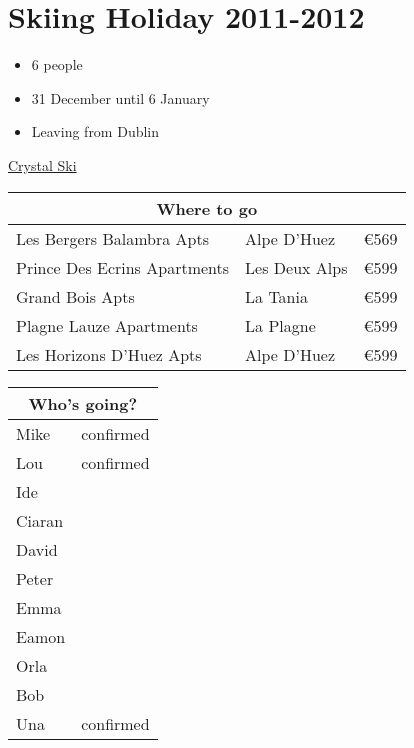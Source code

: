 \documentclass[a4paper]{article}
\begin{document}
\section*{Skiing Holiday 2011-2012}
\begin{itemize}
\item 6 people
\item 31 December until 6 January
\item Leaving from Dublin
\end{itemize}
\href{http://crystalski.ie}{Crystal Ski}

\begin{tabular}{|l|l|l|}
\hline
\multicolumn{3}{|c|}{Where to go} \\
\hline
Les Bergers Balambra Apts & Alpe D'Huez & \euro 569 \\
Prince Des Ecrins Apartments & Les Deux Alps & \euro 599 \\
Grand Bois Apts & La Tania & \euro 599 \\
Plagne Lauze Apartments & La Plagne & \euro 599 \\
Les Horizons D'Huez Apts & Alpe D'Huez & \euro 599 \\
\hline
\end{tabular}

\begin{tabular}{|l|l|}
\hline
\multicolumn{2}{|c|}{Who's going?} \\
\hline
Mike & confirmed \\
Lou & confirmed \\
Ide & \\
Ciaran & \\
David & \\
Peter & \\
Emma & \\
Eamon & \\
Orla & \\
Bob & \\
Una & confirmed \\
\hline
\end{tabular}
\end{document}

